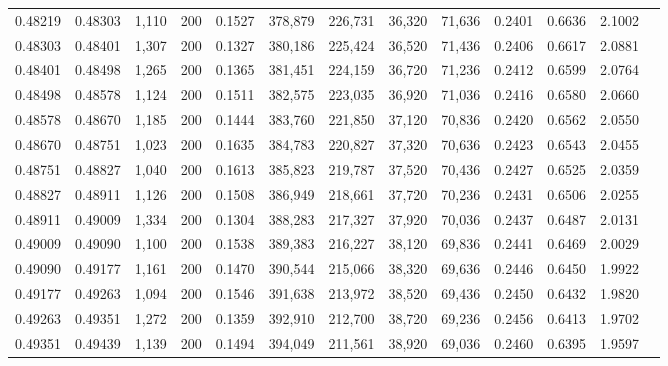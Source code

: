 \begin{tabular}{rrrrrrrrrrrrr}
0.48219 & 0.48303 & 1,110 & 200 &                                     0.1527 & 378,879 & 226,731 &  36,320 &  71,636 & 0.2401 & 0.6636 & 2.1002 \\
0.48303 & 0.48401 & 1,307 & 200 &                                     0.1327 & 380,186 & 225,424 &  36,520 &  71,436 & 0.2406 & 0.6617 & 2.0881 \\
0.48401 & 0.48498 & 1,265 & 200 &                                     0.1365 & 381,451 & 224,159 &  36,720 &  71,236 & 0.2412 & 0.6599 & 2.0764 \\
0.48498 & 0.48578 & 1,124 & 200 &                                     0.1511 & 382,575 & 223,035 &  36,920 &  71,036 & 0.2416 & 0.6580 & 2.0660 \\
0.48578 & 0.48670 & 1,185 & 200 &                                     0.1444 & 383,760 & 221,850 &  37,120 &  70,836 & 0.2420 & 0.6562 & 2.0550 \\
0.48670 & 0.48751 & 1,023 & 200 &                                     0.1635 & 384,783 & 220,827 &  37,320 &  70,636 & 0.2423 & 0.6543 & 2.0455 \\
0.48751 & 0.48827 & 1,040 & 200 &                                     0.1613 & 385,823 & 219,787 &  37,520 &  70,436 & 0.2427 & 0.6525 & 2.0359 \\
0.48827 & 0.48911 & 1,126 & 200 &                                     0.1508 & 386,949 & 218,661 &  37,720 &  70,236 & 0.2431 & 0.6506 & 2.0255 \\
0.48911 & 0.49009 & 1,334 & 200 &                                     0.1304 & 388,283 & 217,327 &  37,920 &  70,036 & 0.2437 & 0.6487 & 2.0131 \\
0.49009 & 0.49090 & 1,100 & 200 &                                     0.1538 & 389,383 & 216,227 &  38,120 &  69,836 & 0.2441 & 0.6469 & 2.0029 \\
0.49090 & 0.49177 & 1,161 & 200 &                                     0.1470 & 390,544 & 215,066 &  38,320 &  69,636 & 0.2446 & 0.6450 & 1.9922 \\
0.49177 & 0.49263 & 1,094 & 200 &                                     0.1546 & 391,638 & 213,972 &  38,520 &  69,436 & 0.2450 & 0.6432 & 1.9820 \\
0.49263 & 0.49351 & 1,272 & 200 &                                     0.1359 & 392,910 & 212,700 &  38,720 &  69,236 & 0.2456 & 0.6413 & 1.9702 \\
0.49351 & 0.49439 & 1,139 & 200 &                                     0.1494 & 394,049 & 211,561 &  38,920 &  69,036 & 0.2460 & 0.6395 & 1.9597 \\

\end{tabular}
